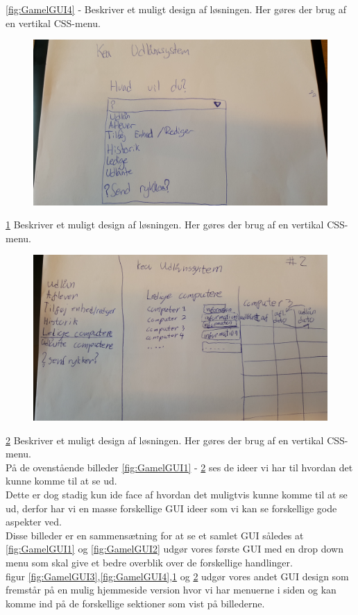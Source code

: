 \documentclass[a4paper]{article}
\begin{document}
\ref{fig:GamelGUI4} - Beskriver et muligt design af løsningen. Her gøres der brug
af en vertikal CSS-menu.\\[0.1in]
\begin{figure}[h!]
\centering
\includegraphics[width=1\textwidth]{5min.jpg}
\caption{}
\label{fig:GamelGUI5}
\end{figure}
\ref{fig:GamelGUI5} Beskriver et muligt design af løsningen. Her gøres der brug af
en vertikal CSS-menu.\\[0.1in]
\begin{figure}[h!]
\centering
\includegraphics[width=1\textwidth]{6min.jpg}
\caption{}
\label{fig:GamelGUI6}
\end{figure}
\ref{fig:GamelGUI6} Beskriver et muligt design af løsningen. Her gøres der brug af
en vertikal CSS-menu.\\[0.1in]
På de ovenstående billeder \ref{fig:GamelGUI1} - \ref{fig:GamelGUI6} ses de ideer vi har til hvordan det kunne
komme til at se ud.\\
Dette er dog stadig kun ide face af hvordan det muligtvis kunne komme til at se
ud, derfor har vi en masse forskellige GUI ideer som vi kan se forskellige gode
aspekter ved.\\
Disse billeder er en sammensætning for at se et samlet GUI således at \ref{fig:GamelGUI1}
og \ref{fig:GamelGUI2} udgør vores første GUI med en drop down menu som skal give et bedre
overblik over de forskellige handlinger.\\
figur \ref{fig:GamelGUI3},\ref{fig:GamelGUI4},\ref{fig:GamelGUI5} og \ref{fig:GamelGUI6} udgør vores andet GUI design som fremstår på en mulig hjemmeside version hvor vi har menuerne i siden og kan komme ind på de forskellige
sektioner som vist på billederne.
\end{document}
